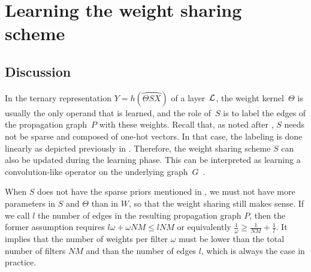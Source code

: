 \section{Learning the weight sharing scheme}
\label{sec:learningscheme}

\subsection{Discussion}

In the ternary representation $Y = h(\wideparen{\Theta S X})$ of a layer~$\mathcal{L}$, the weight kernel~$\Theta$ is usually the only operand that is learned, and the role of~$S$ is to label the edges of the propagation graph~$P$ with these weights. Recall that, as noted after , $S$ needs not be sparse and composed of one-hot vectors. In that case, the labeling is done linearly as depicted previously in . Therefore, the weight sharing scheme $S$ can also be updated during the learning phase. This can be interpreted as learning a convolution-like operator on the underlying graph~$G$~\citep{vialatte2017learning}.

\begin{remark}
When $S$ does not have the sparse priors mentioned in , we must not have more parameters in $S$ and $\Theta$ than in $W$, so that the weight sharing still makes sense. If we call $l$ the number of edges in the resulting propagation graph $P$, then the former assumption requires $l\omega + \omega NM \leq lNM$ or equivalently $\frac{1}{\omega} \geq \frac{1}{NM} + \frac{1}{l}$. It implies that the number of weights per filter $\omega$ must be lower than the total number of filters $NM$ and than the number of edges $l$, which is always the case in practice.
\end{remark}




